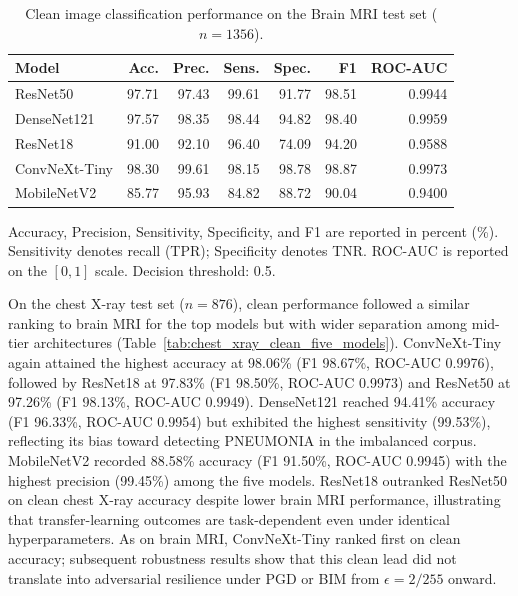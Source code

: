 \documentclass[12pt,a4paper,oneside]{report}
\begin{document}
\begin{table}[htbp]
  \centering
  \caption{Clean image classification performance on the Brain MRI test set ($n=1356$).}
  \label{tab:brain_mri_clean_five_models}
  \begin{tabular}{lrrrrrr}
    \toprule
    Model & Acc. & Prec. & Sens. & Spec. & F1 & ROC-AUC \\
    \midrule
    ResNet50      & 97.71 & 97.43 & 99.61 & 91.77 & 98.51 & 0.9944 \\
    DenseNet121   & 97.57 & 98.35 & 98.44 & 94.82 & 98.40 & 0.9959 \\
    ResNet18      & 91.00 & 92.10 & 96.40 & 74.09 & 94.20 & 0.9588 \\
    ConvNeXt-Tiny & 98.30 & 99.61 & 98.15 & 98.78 & 98.87 & 0.9973 \\
    MobileNetV2   & 85.77 & 95.93 & 84.82 & 88.72 & 90.04 & 0.9400 \\
    \bottomrule
  \end{tabular}
  \vspace{0.25em}
  \begin{minipage}{0.92\linewidth}
    \footnotesize
    Accuracy, Precision, Sensitivity, Specificity, and F1 are reported in percent (\%).
    Sensitivity denotes recall (TPR); Specificity denotes TNR.
    ROC-AUC is reported on the $[0,1]$ scale. Decision threshold: 0.5.
  \end{minipage}
\end{table}

On the chest X-ray test set ($n=876$), clean performance followed a similar ranking to brain MRI for the top models but with wider separation among mid-tier architectures (Table~\ref{tab:chest_xray_clean_five_models}). ConvNeXt-Tiny again attained the highest accuracy at 98.06\% (F1 98.67\%, ROC-AUC 0.9976), followed by ResNet18 at 97.83\% (F1 98.50\%, ROC-AUC 0.9973) and ResNet50 at 97.26\% (F1 98.13\%, ROC-AUC 0.9949). DenseNet121 reached 94.41\% accuracy (F1 96.33\%, ROC-AUC 0.9954) but exhibited the highest sensitivity (99.53\%), reflecting its bias toward detecting PNEUMONIA in the imbalanced corpus. MobileNetV2 recorded 88.58\% accuracy (F1 91.50\%, ROC-AUC 0.9945) with the highest precision (99.45\%) among the five models. ResNet18 outranked ResNet50 on clean chest X-ray accuracy despite lower brain MRI performance, illustrating that transfer-learning outcomes are task-dependent even under identical hyperparameters. As on brain MRI, ConvNeXt-Tiny ranked first on clean accuracy; subsequent robustness results show that this clean lead did not translate into adversarial resilience under PGD or BIM from $\epsilon = 2/255$ onward.
\end{document}
